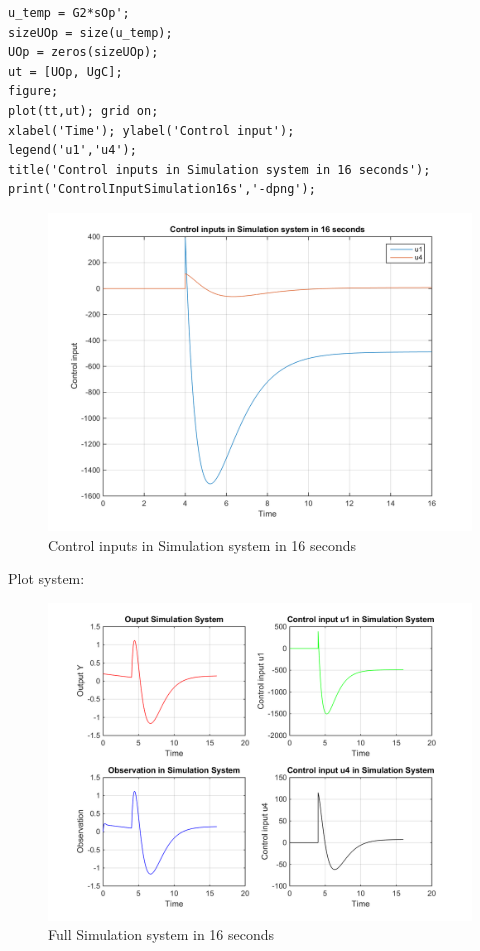 \documentclass[14pt,a4paper]{article}
\begin{document}
\begin{lstlisting}
u_temp = G2*sOp';
sizeUOp = size(u_temp);
UOp = zeros(sizeUOp);
ut = [UOp, UgC];
figure;
plot(tt,ut); grid on;
xlabel('Time'); ylabel('Control input');
legend('u1','u4');
title('Control inputs in Simulation system in 16 seconds');
print('ControlInputSimulation16s','-dpng');
\end{lstlisting}	
\begin{figure}[htp]
	\begin{center}
		\includegraphics[scale = 0.9]{ControlInputSimulation16s.png}
		\caption{Control inputs in Simulation system in 16 seconds}
	\end{center}
\end{figure}	
\pagebreak
	
	Plot system: \\
\begin{figure}[htp]
	\begin{center}
		\includegraphics[scale = 0.9]{SimulationSystem.png}
		\caption{Full Simulation system in 16 seconds}
	\end{center}
\end{figure}		
	
	
\end{document}
